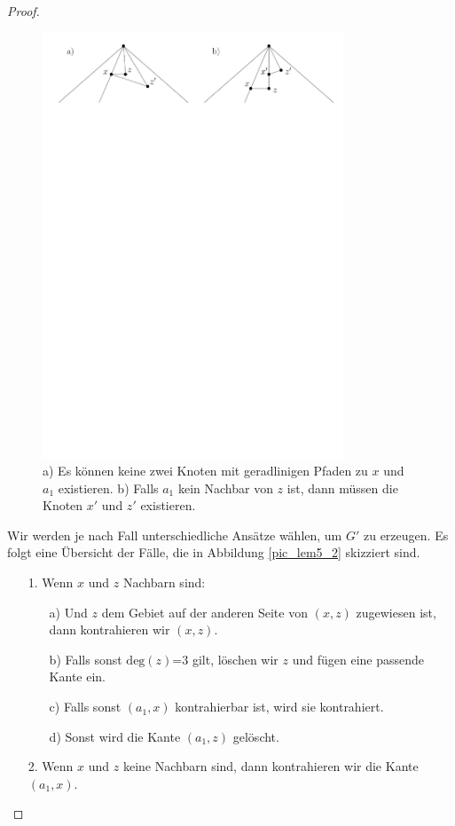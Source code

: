 \begin{proof}
\begin{figure}
	\centering
	  \includegraphics[width=0.8\textwidth]{lem5_1.pdf}
    	\caption{a) Es können keine zwei Knoten mit geradlinigen Pfaden zu $x$ und $a_1$ existieren. b) Falls $a_1$ kein Nachbar von $z$ ist, dann müssen die Knoten $x'$ und $z'$ existieren.}
    	\label{pic_lem5_1}
\end{figure}

Wir werden je nach Fall unterschiedliche Ansätze wählen, um $G'$ zu erzeugen. Es folgt eine Übersicht der Fälle, die in Abbildung \ref{pic_lem5_2} skizziert sind.

\begin{itemize}
\item [1.] Wenn $x$ und $z$ Nachbarn sind:
	\begin{itemize}
	\item [a)] Und $z$ dem Gebiet auf der anderen Seite von $(x,z)$ zugewiesen ist, dann kontrahieren wir $(x,z)$.
	\item [b)] Falls sonst $\text{deg}(z)$=3 gilt, löschen wir $z$ und fügen eine passende Kante ein.
	\item [c)] Falls sonst $(a_1,x)$ kontrahierbar ist, wird sie kontrahiert.
	\item [d)] Sonst wird die Kante $(a_1,z)$ gelöscht.
	\end{itemize}
\item [2.] Wenn $x$ und $z$ keine Nachbarn sind, dann kontrahieren wir die Kante $(a_1,x)$.
\end{itemize} 


\end{proof}
